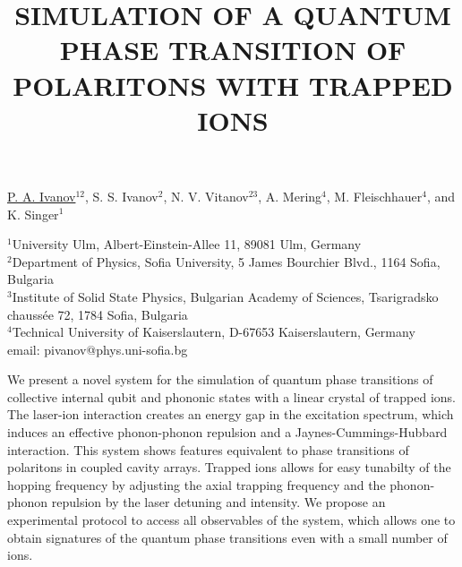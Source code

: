 \title{SIMULATION OF A QUANTUM PHASE TRANSITION OF POLARITONS WITH TRAPPED IONS}

\underline{P. A. Ivanov}$^{12}$, S. S. Ivanov$^{2}$, N. V. Vitanov$^{23}$, A. Mering$^{4}$, M. Fleischhauer$^{4}$, and K. Singer$^{1}$


$^1$University Ulm, Albert-Einstein-Allee 11, 89081 Ulm, Germany\\
$^2$Department of Physics, Sofia University, 5 James Bourchier Blvd., 1164 Sofia, Bulgaria\\
$^3$Institute of Solid State Physics, Bulgarian Academy of Sciences, Tsarigradsko chauss\'{e}e 72, 1784 Sofia, Bulgaria\\
$^4$Technical University of Kaiserslautern, D-67653 Kaiserslautern, Germany\\
email: pivanov@phys.uni-sofia.bg

We present a novel system for the simulation of quantum phase transitions of collective internal qubit and phononic states with a linear crystal of trapped ions. 
The laser-ion interaction creates an energy gap in the excitation spectrum, which induces an effective phonon-phonon repulsion and a Jaynes-Cummings-Hubbard interaction. 
This system shows features equivalent to phase transitions of polaritons in coupled cavity arrays.
Trapped ions allows for easy tunabilty of the hopping frequency by adjusting the axial trapping frequency and the phonon-phonon repulsion by the laser detuning and intensity. 
We propose an experimental protocol to access all observables of the system, which allows one to obtain signatures of the quantum phase transitions even with a small number of ions.

